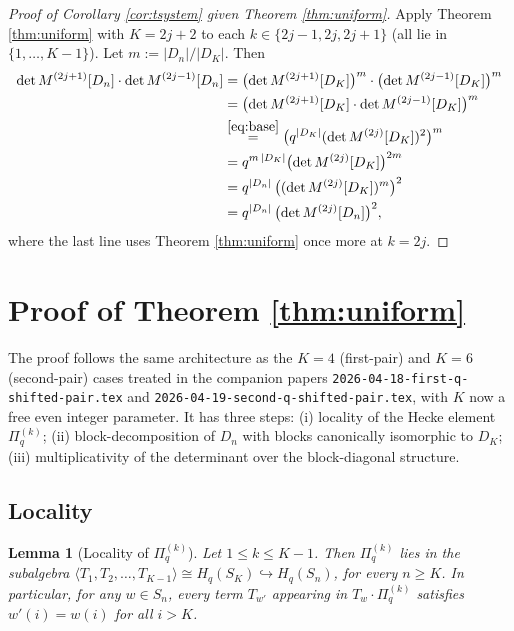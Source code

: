 \documentclass[11pt]{article}
\newtheorem{lemma}[theorem]{Lemma}
\theoremstyle{definition}
\begin{document}
\begin{proof}[Proof of Corollary \ref{cor:tsystem} given Theorem \ref{thm:uniform}]
Apply Theorem \ref{thm:uniform} with $K = 2j+2$ to each $k \in \{2j-1, 2j, 2j+1\}$ (all lie in $\{1, \ldots, K-1\}$).  Let $m := |D_n|/|D_K|$. Then
\begin{align*}
\det M^{(2j+1)}[D_n]\cdot \det M^{(2j-1)}[D_n]
&= \bigl(\det M^{(2j+1)}[D_K]\bigr)^m \cdot \bigl(\det M^{(2j-1)}[D_K]\bigr)^m \\
&= \bigl(\det M^{(2j+1)}[D_K] \cdot \det M^{(2j-1)}[D_K]\bigr)^m \\
&\stackrel{\eqref{eq:base}}{=} \bigl(q^{|D_K|}(\det M^{(2j)}[D_K])^2\bigr)^m \\
&= q^{m\,|D_K|} \bigl(\det M^{(2j)}[D_K]\bigr)^{2m} \\
&= q^{|D_n|}\, \bigl((\det M^{(2j)}[D_K])^m\bigr)^2 \\
&= q^{|D_n|}\, \bigl(\det M^{(2j)}[D_n]\bigr)^2,
\end{align*}
where the last line uses Theorem \ref{thm:uniform} once more at $k = 2j$.
\end{proof}

\section{Proof of Theorem \ref{thm:uniform}}

The proof follows the same architecture as the $K=4$ (first-pair) and $K=6$ (second-pair) cases treated in the companion papers \texttt{2026-04-18-first-q-shifted-pair.tex} and \texttt{2026-04-19-second-q-shifted-pair.tex}, with $K$ now a free even integer parameter.  It has three steps: (i) locality of the Hecke element $\Pi^{(k)}_q$; (ii) block-decomposition of $D_n$ with blocks canonically isomorphic to $D_K$; (iii) multiplicativity of the determinant over the block-diagonal structure.

\subsection{Locality}

\begin{lemma}[Locality of $\Pi^{(k)}_q$]\label{lem:loc}
Let $1 \leq k \leq K - 1$.  Then $\Pi^{(k)}_q$ lies in the subalgebra $\langle T_1, T_2, \ldots, T_{K-1}\rangle \cong H_q(S_K) \hookrightarrow H_q(S_n)$, for every $n \geq K$.  In particular, for any $w \in S_n$, every term $T_{w'}$ appearing in $T_w \cdot \Pi^{(k)}_q$ satisfies $w'(i) = w(i)$ for all $i > K$.
\end{lemma}
\end{document}
